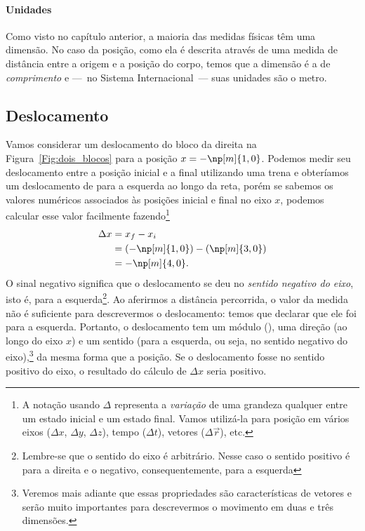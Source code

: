 \paragraph{Unidades}

Como visto no capítulo anterior, a maioria das medidas físicas têm uma dimensão. No caso da posição, como ela é descrita através de uma medida de distância entre a origem e a posição do corpo, temos que a dimensão é a de \emph{comprimento} e ---~no Sistema Internacional~--- suas unidades são o metro.

\subsection{Deslocamento}

Vamos considerar um deslocamento do bloco da direita na Figura~\ref{Fig:dois_blocos} para a posição $x = -\np[m]{1,0}$. Podemos medir seu deslocamento entre a posição inicial e a final utilizando uma trena e obteríamos um deslocamento de  para a esquerda ao longo da reta, porém se sabemos os valores numéricos associados às posições inicial e final no eixo $x$, podemos calcular esse valor facilmente fazendo\footnote{A notação usando $\Delta$ representa a \emph{variação} de uma grandeza qualquer entre um estado inicial e um estado final. Vamos utilizá-la para posição em vários eixos ($\Delta x$, $\Delta y$, $\Delta z$), tempo ($\Delta t$), vetores ($\Delta\vec{r}$), etc.}
\begin{align}
  \Delta x &= x_f - x_i \\
  &= (-\np[m]{1,0}) - (\np[m]{3,0}) \\
  &= -\np[m]{4,0}.
\end{align}
%
O sinal negativo significa que o deslocamento se deu no \emph{sentido negativo do eixo}, isto é, para a esquerda\footnote{Lembre-se que o sentido do eixo é arbitrário. Nesse caso o sentido positivo é para a direita e o negativo, consequentemente, para a esquerda}. Ao aferirmos a distância percorrida, o valor da medida não é suficiente para descrevermos o deslocamento: temos que declarar que ele foi para a esquerda. Portanto, o deslocamento tem um módulo (), uma direção (ao longo do eixo $x$) e um sentido (para a esquerda, ou seja, no sentido negativo do eixo),\footnote{Veremos mais adiante que essas propriedades são características de vetores e serão muito importantes para descrevermos o movimento em duas e três dimensões.} da mesma forma que a posição. Se o deslocamento fosse no sentido positivo do eixo, o resultado do cálculo de $\Delta x$ seria positivo. 

